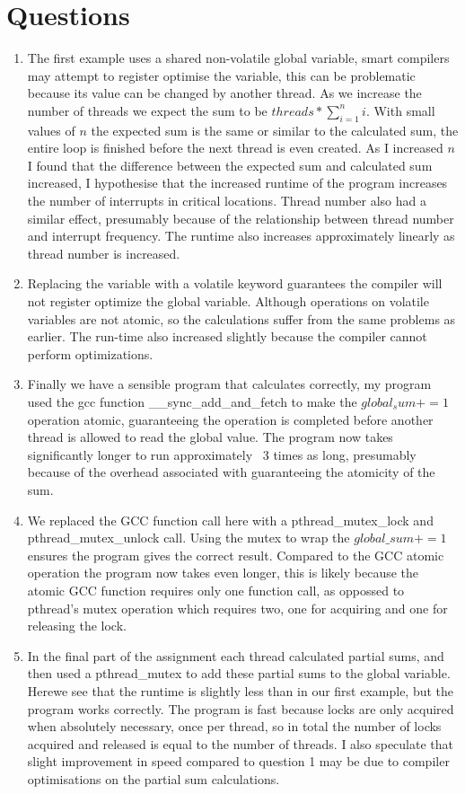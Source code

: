 \documentclass[12pt]{article}
\begin{document}
\section{Questions} 
\begin{enumerate}
\item The first example uses a shared non-volatile global variable, smart compilers may attempt to register optimise the variable, this can be problematic because its
    value can be changed by another thread. As we increase the number of threads we expect the sum to be $ threads * \sum_{i=1}^{n} i$. With small values of $ n $
    the expected sum is the same or similar to the calculated sum, the entire loop is finished before the next thread is even created. As I increased $ n $ I found that the difference between the expected sum and calculated sum increased, I hypothesise that the increased runtime of the program increases the number of interrupts in critical locations. Thread number also had a similar effect, presumably because of the relationship between thread number and interrupt frequency. The runtime also increases approximately linearly as thread number is increased. 
    
\item Replacing the variable with a volatile keyword guarantees the compiler will not register optimize the global variable. Although operations on volatile variables are not atomic, so the calculations suffer from the same problems as earlier. The run-time also increased slightly because the compiler cannot perform  optimizations. 
\item
    Finally we have a sensible program that calculates correctly, my program used the gcc function \_\_sync\_add\_and\_fetch\(\) to make the $ global_sum += 1 $ operation atomic, guaranteeing the operation is completed before another thread is allowed to read the global value. The program now takes significantly longer to run approximately ~3 times as long, presumably because of the overhead associated with guaranteeing the atomicity of the sum. 
\item 
    We replaced the GCC function call here with a pthread\_mutex\_lock and pthread\_mutex\_unlock call. Using the mutex to wrap the $ global\_sum +=1 $ ensures the program gives the correct result. Compared to the GCC atomic operation the program now takes even longer, this is likely because the atomic GCC function requires only one function call, as oppossed to pthread's mutex operation which requires two, one for acquiring and one for releasing the lock.  
\item
    In the final part of the assignment each thread calculated partial sums, and then used a pthread\_mutex to add these partial sums to the global variable. Herewe see that the runtime is slightly less than in our first example, but the program works correctly. The program is fast because locks are only acquired when absolutely necessary, once per thread, so in total the number of locks acquired and released is equal to the number of threads. I also speculate that slight improvement in speed compared to question 1 may be due to compiler optimisations on the partial sum calculations.  
            
\end{enumerate} 
\end{document}
